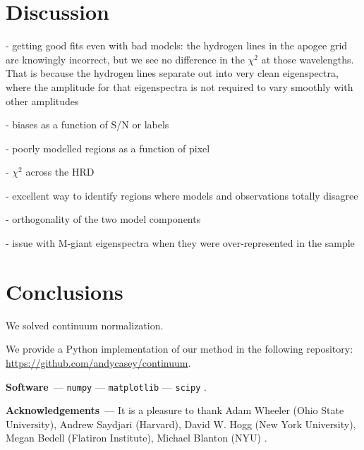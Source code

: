 \documentclass[modern]{aastex631}
\renewcommand{\paragraph}[1]{\medskip\par\noindent\textbf{#1}~---}
\begin{document}
\section{Discussion}\label{sec:discussion}

- getting good fits even with bad models: the hydrogen lines in the apogee grid are knowingly incorrect, but we see no difference in the $\chi^2$ at those wavelengths. That is because the hydrogen lines separate out into very clean eigenspectra, where the amplitude for that eigenspectra is not required to vary smoothly with other amplitudes

- biases as a function of S/N or labels

- poorly modelled regions as a function of pixel

- $\chi^2$ across the HRD

- excellent way to identify regions where models and observations totally disagree

- orthogonality of the two model components

- issue with M-giant eigenspectra when they were over-represented in the sample

\section{Conclusions}
\label{sec:conclusions}

We solved continuum normalization.


\noindent{}We provide a Python implementation of our method in the following repository: \url{https://github.com/andycasey/continuum}. 

\paragraph{Software}
\texttt{numpy} \citep{numpy} ---
\texttt{matplotlib} \citep{matplotlib} ---
\texttt{scipy} \citep{scipy}.

\paragraph{Acknowledgements}
It is a pleasure to thank
    Adam Wheeler (Ohio State University),
    Andrew Saydjari (Harvard),
    David W. Hogg (New York University),
    Megan Bedell (Flatiron Institute),
    Michael Blanton (NYU)
.

%
\end{document}
